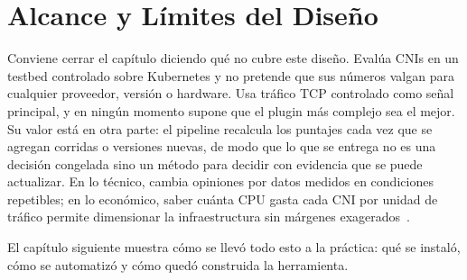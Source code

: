 \section{Alcance y Límites del Diseño}

Conviene cerrar el capítulo diciendo qué no cubre este diseño. Evalúa CNIs en un testbed controlado sobre Kubernetes y no pretende que sus números valgan para cualquier proveedor, versión o hardware. Usa tráfico TCP controlado como señal principal, y en ningún momento supone que el plugin más complejo sea el mejor. Su valor está en otra parte: el pipeline recalcula los puntajes cada vez que se agregan corridas o versiones nuevas, de modo que lo que se entrega no es una decisión congelada sino un método para decidir con evidencia que se puede actualizar. En lo técnico, cambia opiniones por datos medidos en condiciones repetibles; en lo económico, saber cuánta CPU gasta cada CNI por unidad de tráfico permite dimensionar la infraestructura sin márgenes exagerados~\cite{ref29}.

El capítulo siguiente muestra cómo se llevó todo esto a la práctica: qué se instaló, cómo se automatizó y cómo quedó construida la herramienta.

